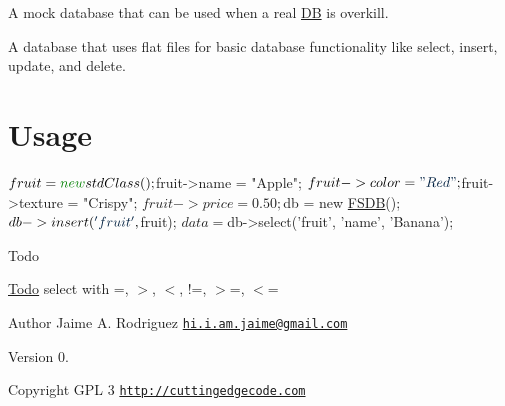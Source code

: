 A mock database that can be used when a real \hyperlink{class_d_b}{D\-B} is overkill.

A database that uses flat files for basic database functionality like select, insert, update, and delete.\hypertarget{template1_usage}{}\section{Usage}\label{template1_usage}

\begin{DoxyCode}
$fruit = \textcolor{keyword}{new} stdClass();
$fruit->name = \textcolor{stringliteral}{"Apple"};
$fruit->color = \textcolor{stringliteral}{"Red"};
$fruit->texture = \textcolor{stringliteral}{"Crispy"};
$fruit->price = 0.50;

$db = \textcolor{keyword}{new} \hyperlink{class_f_s_d_b}{FSDB}();
$db->insert(\textcolor{stringliteral}{'fruit'}, $fruit);
$data = $db->select(\textcolor{stringliteral}{'fruit'}, \textcolor{stringliteral}{'name'}, \textcolor{stringliteral}{'Banana'});
\end{DoxyCode}


\begin{DoxyRefDesc}{Todo}
\item[\hyperlink{todo__todo000001}{Todo}]select with =, $>$, $<$, !=, $>$=, $<$= \end{DoxyRefDesc}
\begin{DoxyAuthor}{Author}
Jaime A. Rodriguez \href{mailto:hi.i.am.jaime@gmail.com}{\tt hi.\-i.\-am.\-jaime@gmail.\-com} 
\end{DoxyAuthor}
\begin{DoxyVersion}{Version}
0. 
\end{DoxyVersion}
\begin{DoxyCopyright}{Copyright}
G\-P\-L 3 \href{http://cuttingedgecode.com}{\tt http\-://cuttingedgecode.\-com} 
\end{DoxyCopyright}
